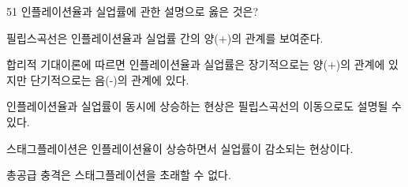 \begin{question}{51}
인플레이션율과 실업률에 관한 설명으로 옳은 것은?
\begin{choices}
  \item 필립스곡선은 인플레이션율과 실업률 간의 양(+)의 관계를 보여준다.
  \item 합리적 기대이론에 따르면 인플레이션율과 실업률은 장기적으로는 양(+)의 관계에 있지만 단기적으로는 음(-)의 관계에 있다.
  \item 인플레이션율과 실업률이 동시에 상승하는 현상은 필립스곡선의 이동으로도 설명될 수 있다.
  \item 스태그플레이션은 인플레이션율이 상승하면서 실업률이 감소되는 현상이다.
  \item 총공급 충격은 스태그플레이션을 초래할 수 없다.
\end{choices}
\end{question}

